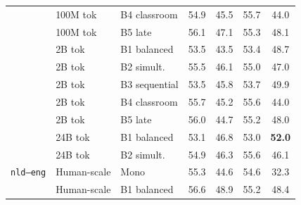 \documentclass[11pt]{article}
\begin{document}
\begin{table}[!ht]
\begin{minipage}[t]{0.49\linewidth}
\begin{tabular}{ll l cccc}
 & 100M tok & B4 classroom & \cellcolor[rgb]{0.949,1.000,0.949} 54.9 & \cellcolor[rgb]{1.000,0.957,0.957} 45.5 & \cellcolor[rgb]{0.925,1.000,0.925} 55.7 & \cellcolor[rgb]{1.000,0.934,0.934} 44.0 \\
 & 100M tok & B5 late & \cellcolor[rgb]{0.936,1.000,0.936} 56.1 & \cellcolor[rgb]{1.000,0.972,0.972} 47.1 & \cellcolor[rgb]{0.930,1.000,0.930} 55.3 & \cellcolor[rgb]{1.000,0.979,0.979} 48.1 \\
\addlinespace[1.5pt]
 & 2B tok & B1 balanced & \cellcolor[rgb]{0.964,1.000,0.964} 53.5 & \cellcolor[rgb]{1.000,0.937,0.937} 43.5 & \cellcolor[rgb]{0.955,1.000,0.955} 53.4 & \cellcolor[rgb]{1.000,0.986,0.986} 48.7 \\
 & 2B tok & B2 simult. & \cellcolor[rgb]{0.943,1.000,0.943} 55.5 & \cellcolor[rgb]{1.000,0.962,0.962} 46.1 & \cellcolor[rgb]{0.934,1.000,0.934} 55.0 & \cellcolor[rgb]{1.000,0.967,0.967} 47.0 \\
 & 2B tok & B3 sequential & \cellcolor[rgb]{0.964,1.000,0.964} 53.5 & \cellcolor[rgb]{1.000,0.960,0.960} 45.8 & \cellcolor[rgb]{0.951,1.000,0.951} 53.7 & \cellcolor[rgb]{1.000,0.999,0.999} 49.9 \\
 & 2B tok & B4 classroom & \cellcolor[rgb]{0.941,1.000,0.941} 55.7 & \cellcolor[rgb]{1.000,0.954,0.954} 45.2 & \cellcolor[rgb]{0.926,1.000,0.926} 55.6 & \cellcolor[rgb]{1.000,0.934,0.934} 44.0 \\
 & 2B tok & B5 late & \cellcolor[rgb]{0.937,1.000,0.937} 56.0 & \cellcolor[rgb]{1.000,0.949,0.949} 44.7 & \cellcolor[rgb]{0.931,1.000,0.931} 55.2 & \cellcolor[rgb]{1.000,0.978,0.978} 48.0 \\
\addlinespace[1.5pt]
 & 24B tok & B1 balanced & \cellcolor[rgb]{0.968,1.000,0.968} 53.1 & \cellcolor[rgb]{1.000,0.969,0.969} 46.8 & \cellcolor[rgb]{0.960,1.000,0.960} 53.0 & \cellcolor[rgb]{0.959,1.000,0.959} \textbf{52.0} \\
 & 24B tok & B2 simult. & \cellcolor[rgb]{0.949,1.000,0.949} 54.9 & \cellcolor[rgb]{1.000,0.964,0.964} 46.3 & \cellcolor[rgb]{0.926,1.000,0.926} 55.6 & \cellcolor[rgb]{1.000,0.957,0.957} 46.1 \\
\midrule
\texttt{nld--eng} & Human-scale & Mono & \cellcolor[rgb]{0.945,1.000,0.945} 55.3 & \cellcolor[rgb]{1.000,0.948,0.948} 44.6 & \cellcolor[rgb]{0.939,1.000,0.939} 54.6 & \cellcolor[rgb]{1.000,0.805,0.805} 32.3 \\
 & Human-scale & B1 balanced & \cellcolor[rgb]{0.931,1.000,0.931} 56.6 & \cellcolor[rgb]{1.000,0.989,0.989} 48.9 & \cellcolor[rgb]{0.931,1.000,0.931} 55.2 & \cellcolor[rgb]{1.000,0.982,0.982} 48.4 \\

\end{tabular}
\end{minipage}
\end{table}
\end{document}
